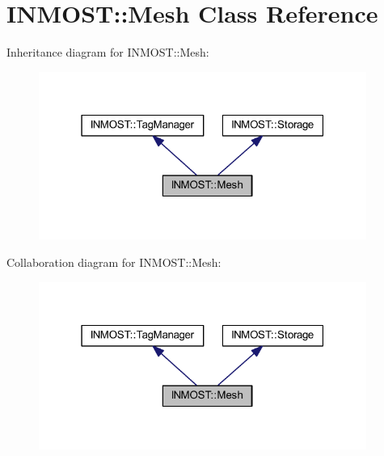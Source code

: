 \hypertarget{classINMOST_1_1Mesh}{\section{I\-N\-M\-O\-S\-T\-:\-:Mesh Class Reference}
\label{classINMOST_1_1Mesh}
}


Inheritance diagram for I\-N\-M\-O\-S\-T\-:\-:Mesh\-:
\nopagebreak
\begin{figure}[H]
\begin{center}
\leavevmode
\includegraphics[width=304pt]{classINMOST_1_1Mesh__inherit__graph}
\end{center}
\end{figure}


Collaboration diagram for I\-N\-M\-O\-S\-T\-:\-:Mesh\-:
\nopagebreak
\begin{figure}[H]
\begin{center}
\leavevmode
\includegraphics[width=304pt]{classINMOST_1_1Mesh__coll__graph}
\end{center}
\end{figure}
